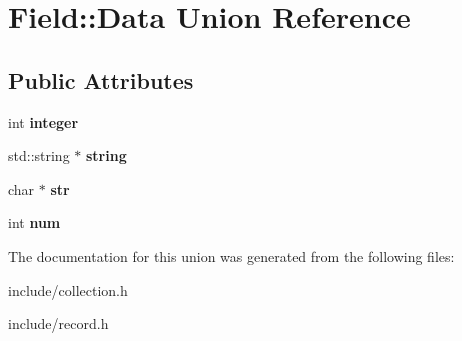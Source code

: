 \hypertarget{union_field_1_1_data}{}\section{Field\+:\+:Data Union Reference}
\label{union_field_1_1_data}
\subsection*{Public Attributes}
\begin{DoxyCompactItemize}
\item 
\mbox{\label{union_field_1_1_data_a3cbf50c722b2632c2c86ce35de9464e1}} 
int {\bfseries integer}
\item 
\mbox{\label{union_field_1_1_data_af5926a75c50c773645711698831c4767}} 
std\+::string $\ast$ {\bfseries string}
\item 
\mbox{\label{union_field_1_1_data_a2534986334ffe9070e6ad2b5d74b449e}} 
char $\ast$ {\bfseries str}
\item 
\mbox{\label{union_field_1_1_data_afdd5f3468c0f038045c30623ba3f34ea}} 
int {\bfseries num}
\end{DoxyCompactItemize}


The documentation for this union was generated from the following files\+:\begin{DoxyCompactItemize}
\item 
include/collection.\+h\item 
include/record.\+h\end{DoxyCompactItemize}
